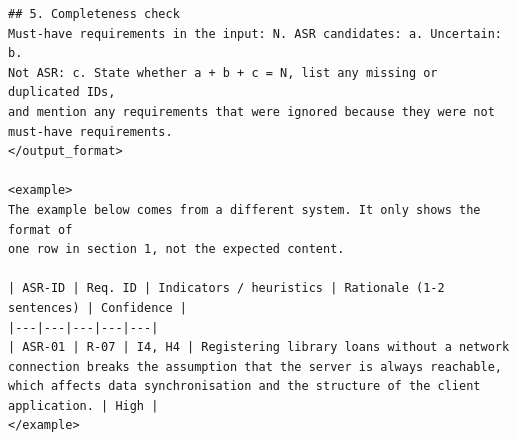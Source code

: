\begin{lstlisting}
## 5. Completeness check
Must-have requirements in the input: N. ASR candidates: a. Uncertain: b.
Not ASR: c. State whether a + b + c = N, list any missing or duplicated IDs,
and mention any requirements that were ignored because they were not
must-have requirements.
</output_format>

<example>
The example below comes from a different system. It only shows the format of
one row in section 1, not the expected content.

| ASR-ID | Req. ID | Indicators / heuristics | Rationale (1-2 sentences) | Confidence |
|---|---|---|---|---|
| ASR-01 | R-07 | I4, H4 | Registering library loans without a network connection breaks the assumption that the server is always reachable, which affects data synchronisation and the structure of the client application. | High |
</example>
\end{lstlisting}

